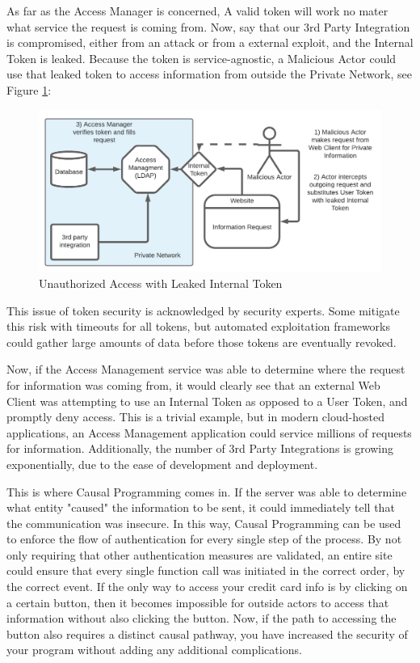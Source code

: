 \documentclass[runningheads]{llncs}
\begin{document}
As far as the Access Manager is concerned, A valid token will work no mater what service the request is coming from. Now, say that our 3rd Party Integration is compromised, either from an attack or from a external exploit, and the Internal Token is leaked. Because the token is service-agnostic, a Malicious Actor could use that leaked token to access information from outside the Private Network, see Figure \ref{fig:BadActor}:

\begin{figure}
    \centering
    \includegraphics[width=\textwidth]{figures/BadActor.png}
    \caption{Unauthorized Access with Leaked Internal Token}
    \label{fig:BadActor}
\end{figure}

This issue of token security is acknowledged by security experts. Some mitigate this risk with timeouts for all tokens, but automated exploitation frameworks could gather large amounts of data before those tokens are eventually revoked.

Now, if the Access Management service was able to determine where the request for information was coming from, it would clearly see that an external Web Client was attempting to use an Internal Token as opposed to a User Token, and promptly deny access. This is a trivial example, but in modern cloud-hosted applications, an Access Management application could service millions of requests for information. Additionally, the number of 3rd Party Integrations is growing exponentially, due to the ease of development and deployment. 

This is where Causal Programming comes in. If the server was able to determine what entity "caused" the information to be sent, it could immediately tell that the communication was insecure. In this way, Causal Programming can be used to enforce the flow of authentication for every single step of the process. By not only requiring that other authentication measures are validated, an entire site could ensure that every single function call was initiated in the correct order, by the correct event. If the only way to access your credit card info is by clicking on a certain button, then it becomes impossible for outside actors to access that information without also clicking the button. Now, if the path to accessing the button also requires a distinct causal pathway, you have increased the security of your program without adding any additional complications.
\end{document}
